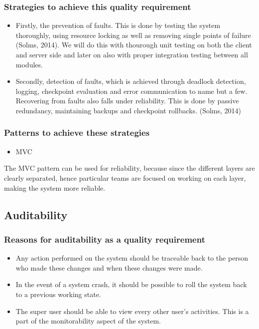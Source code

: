 \documentclass[a4paper,12pt]{article}
\begin{document}
\subsubsection{Strategies to achieve this quality requirement}
\begin{itemize}
\item Firstly, the prevention of faults. This is done by testing the system thoroughly, using resource locking as well as removing single points of failure (Solms, 2014). We will do this with thourough unit testing on both the client and server side and later on also with proper integration testing between all modules. 
 \item Secondly, detection of faults, which is achieved through deadlock detection, logging, checkpoint evaluation and error communication to name but a few. Recovering from faults also falls under reliability. This is done by passive redundancy, maintaining backups and checkpoint rollbacks. (Solms, 2014)
 \end{itemize}

 \subsubsection{Patterns to achieve these strategies}
 \begin{itemize}
 \item MVC
 \end{itemize}
 The MVC pattern can  be used for reliability, because since the different layers are clearly separated, hence particular teams are focused on working on each layer, making the system more reliable. 

 \subsection{Auditability}

 \subsubsection{Reasons for auditability as a quality requirement}
 \begin{itemize}
 \item Any action performed on the system should be traceable back to the person who made these changes and when these changes were made.
 \item In the event of a system crash, it should be possible to roll the system back to a previous working state.
 \item The super user should be able to view every other user's activities. This is a part of the monitorability aspect of the system.
 \end{itemize}
\end{document}
